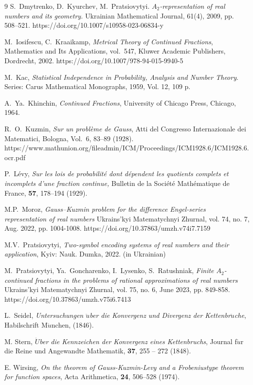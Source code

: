 \documentclass[11pt]{amsart}
\theoremstyle{plain}
\theoremstyle{remark}
\begin{document}
  \begin{thebibliography}{9}
  S.~Dmytrenko, D.~Kyurchev, M.~Pratsiovytyi.
\emph{$A_2$-representation of real numbers and its geometry.}
Ukrainian Mathematical Journal, 61(4), 2009, pp. 508–521.
 https://doi.org/10.1007/s10958-023-06834-y

M.~Iosifescu, C.~Kraaikamp,
\emph{Metrical Theory of Continued Fractions},
Mathematics and Its Applications, vol.~547,
Kluwer Academic Publishers, Dordrecht, 2002.
https://doi.org/10.1007/978-94-015-9940-5

M.~Kac, \emph{Statistical Independence in Probability, Analysis and Number Theory}. 
Series: Carus Mathematical Monographs, 1959, Vol. 12, 109 p.


A.~Ya.~Khinchin,
\emph{Continued Fractions},
University of Chicago Press,
Chicago, 1964.

 R.~O.~Kuzmin,
\emph{Sur un problème de Gauss},
Atti del Congresso Internazionale dei Matematici, Bologna,
Vol.~6, 83--89 (1928).
https://www.mathunion.org/fileadmin/ICM/Proceedings/ICM1928.6/ICM1928.6.ocr.pdf

P.~Lévy,
\emph{Sur les lois de probabilité dont dépendent les quotients complets et incomplets d'une fraction continue,}
Bulletin de la Société Mathématique de France,
\textbf{57}, 178--194 (1929).

M.P.~Moroz, \emph{Gauss–Kuzmin problem for the difference Engel-series representation of real numbers} Ukrains'kyi Matematychnyi Zhurnal, vol. 74, no. 7, Aug. 2022, pp. 1004-1008. https://doi.org/10.37863/umzh.v74i7.7159

M.V.~Pratsiovytyi, \emph{Two-symbol encoding systems of real numbers and their application}, Kyiv: Nauk. Dumka, 2022. (in Ukrainian)


M.~Pratsiovytyi, Ya.~Goncharenko, I.~Lysenko, S.~Ratushniak, \emph{Finite $A_2$-continued fractions in the problems of rational approximations of real numbers} Ukrains'kyi Matematychnyi Zhurnal, vol. 75, no. 6, June 2023, pp. 849-858.
https://doi.org/10.37863/umzh.v75i6.7413



 L.~Seidel, \emph{Untersuchungen
$\ddot u$ber die Konvergenz und Divergenz der Kettenbr$\ddot u$che},
Habilschrift M$\ddot u$nchen,  (1846).

 M. Stern, \emph{$\ddot U$ber die Kennzeichen der Konvergenz eines Kettenbruchs},
Journal f$\ddot u$r die Reine und Angewandte Mathematik,  \textbf{37},  255 -- 272 (1848).


E. Wirsing, \emph{On the theorem of Gauss-Kuzmin-Levy and a Frobeniustype theorem for function spaces}, Acta Arithmetica, \textbf{24},  506--528 (1974).
  \end{thebibliography}
\end{document}
